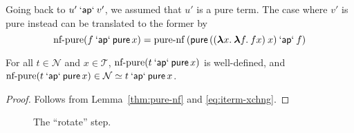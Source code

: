 Going back to $u' \mathbin{\mathsf{`ap`}} v'$, we assumed that $u'$ is a pure term.
The case where $v'$ is pure instead can be translated to the former by
\begin{equation}
	\operatorname{nf-pure}(f \mathbin{\mathsf{`ap`}} \operatorname{\mathsf{pure}} x) =
		\operatorname{pure-nf}{(\operatorname{\mathsf{pure}}{(({\boldsymbol\lambda} x.\>{\boldsymbol\lambda} f.\>f x) \> x)} \mathbin{\mathsf{`ap`}} f)} \\
\end{equation}
\begin{lemma}\label{thm:nf-pure}
For all $t \in \mathcal{N}$ and $x \in \mathcal{T}$,
$\operatorname{nf-pure}(t \mathbin{\mathsf{`ap`}} \operatorname{\mathsf{pure}} x)$ is well-defined, and
$\operatorname{nf-pure}(t \mathbin{\mathsf{`ap`}} \operatorname{\mathsf{pure}} x) \in \mathcal{N} \simeq t \mathbin{\mathsf{`ap`}} \operatorname{\mathsf{pure}} x$.
\end{lemma}
\begin{proof}
Follows from Lemma~\ref{thm:pure-nf} and \eqref{eq:iterm-xchng}.
\end{proof}

\begin{figure}\centering
{}
\raisebox{10mm}{$\qquad\simeq\qquad$}
\caption{The ``rotate'' step.}
\label{fig:rotate}
\end{figure}

